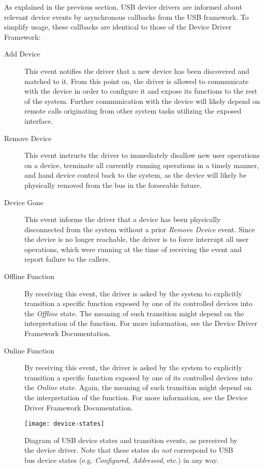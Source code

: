 As explained in the previous section, USB device drivers are informed about
relevant device events by asynchronous callbacks from the USB framework. To
simplify usage, these callbacks are identical to those of the Device Driver
Framework:
~
\begin{description}
	\item[Add Device] This event notifies the driver that a new device has been
	discovered and matched to it. From this point on, the driver is allowed to
	communicate with the device in order to configure it and expose its
	functions to the rest of the system. Further communication with the device
	will likely depend on remote calls originating from other system tasks
	utilizing the exposed interface.

	\item[Remove Device] This event instructs the driver to immediately disallow
	new user operations on a device, terminate all currently running
	operations in a timely manner, and hand device control back to the system,
	as the device will likely be physically removed from the bus in the
	forseeable future.

	\item[Device Gone] This event informs the driver that a device has been
	physically disconnected from the system without a prior \textit{Remove
	Device} event. Since the device is no longer reachable, the driver is to
	force interrupt all user operations, which were running at the time of
	receiving the event and report failure to the callers.
	
	\item[Offline Function] By receiving this event, the driver is asked by the
	system to explicitly transition a specific function exposed by one of its
	controlled devices into the \textit{Offline} state. The meaning of such
	transition might depend on the interpretation of the function. For more
	information, see the Device Driver Framework Documentation.

	\item[Online Function] By receiving this event, the driver is asked by the
	system to explicitly transition a specific function exposed by one of its
	controlled devices into the \textit{Online} state. Again, the meaning of such
	transition might depend on the interpretation of the function. For more
	information, see the Device Driver Framework Documentation.
\end{description}

\begin{figure}
	\centering
	\texttt{[image: device-states]}
	\caption[Diagram of USB device states and transition events.]{Diagram of USB
	device states and transition events, as perceived by the device driver. Note
	that these states do \textit{not} correspond to USB bus device states (e.g.
	\textit{Configured}, \textit{Addressed}, etc.) in any way.}
	\label{fig:device-states}
\end{figure}

